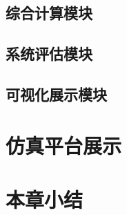 \subsection{综合计算模块}



\subsection{系统评估模块}



\subsection{可视化展示模块}


\section{仿真平台展示}

\section{本章小结}